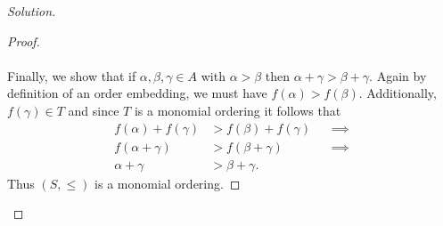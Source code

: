 \documentclass[]{article}
\newcommand\<{\langle}
\renewcommand\>{\rangle}
\newenvironment{solution}
{
	\begin{proof}[Solution] \text{ }
		\\
	}
	{
	\end{proof}
}
\begin{document}
\begin{solution}
\begin{proof}
		\\
		\\
		Finally, we show that if $\alpha, \beta, \gamma \in A$ with $\alpha > \beta$ then $\alpha + \gamma > \beta + \gamma$. Again by definition of an order embedding, we must have $f(\alpha) > f(\beta)$. Additionally, $f(\gamma) \in T$ and since $T$ is a monomial ordering it follows that
		\begin{align*}
			f(\alpha) + f(\gamma) &> f(\beta) + f(\gamma) &&\implies \\
			f(\alpha + \gamma) &> f(\beta + \gamma) &&\implies \\
			\alpha + \gamma &> \beta + \gamma.
		\end{align*}
		Thus $(S, \leq)$ is a monomial ordering.
	\end{proof}
\end{solution}
\end{document}
